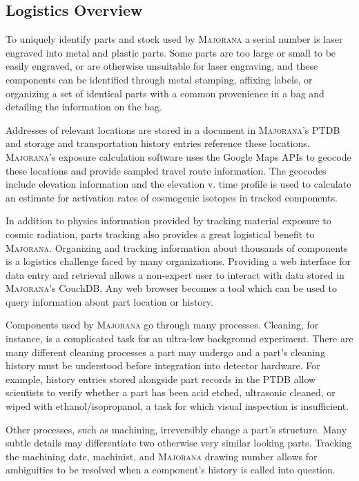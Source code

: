 \documentclass[journal]{IEEEtran}
\begin{document}
\subsection{Logistics Overview}

To uniquely identify parts and stock used by \textsc{Majorana} a serial number is laser engraved into metal and plastic parts.
Some parts are too large or small to be easily engraved, or are otherwise unsuitable for laser engraving, and these
components can be identified through metal stamping, affixing labels, or organizing a set of identical parts
with a common provenience in a bag and detailing the information on the bag.

Addresses of relevant locations are stored in a document in \textsc{Majorana}'s PTDB and storage and transportation history
entries reference these locations. \textsc{Majorana}'s exposure calculation software uses the Google Maps APIs to geocode these
locations and provide sampled travel route information. The geocodes include elevation information and the elevation v. time
profile is used to calculate an estimate for activation rates of cosmogenic isotopes in tracked components.

In addition to physics information provided by tracking material exposure to cosmic radiation, parts tracking also provides
a great logistical benefit to \textsc{Majorana}. Organizing and tracking information about thousands of components is a logistics
challenge faced by many organizations. Providing a web interface for data entry and retrieval allows
a non-expert user to interact with data stored in \textsc{Majorana}'s CouchDB. Any web browser becomes a tool which can
be used to query information about part location or history.

Components used by \textsc{Majorana} go through many processes. Cleaning, for instance, is a complicated task for an ultra-low
background experiment. There are many different cleaning processes a part may undergo and a part's cleaning history
must be understood before integration into detector hardware. For example, history entries stored alongside part records in the PTDB
allow scientists to verify whether a part has been acid etched, ultrasonic cleaned, or wiped with ethanol/isopropanol,
a task for which visual inspection is insufficient.

Other processes, such as machining, irreversibly change a part's structure. Many subtle details may differentiate
two otherwise very similar looking parts. Tracking the machining date, machinist, and \textsc{Majorana} drawing number allows
for ambiguities to be resolved when a component's history is called into question. 
\end{document}
